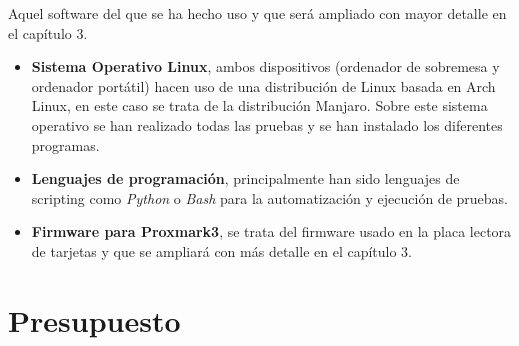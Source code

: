 Aquel software del que se ha hecho uso y que será ampliado con mayor detalle en el capítulo 3.

\begin{itemize}
  \item \textbf{Sistema Operativo Linux}, ambos dispositivos (ordenador de sobremesa y ordenador portátil) hacen uso de
    una distribución de Linux basada en Arch Linux, en este caso se trata de la distribución Manjaro. Sobre este
    sistema operativo se han realizado todas las pruebas y se han instalado los diferentes programas.
  \item \textbf{Lenguajes de programación}, principalmente han sido lenguajes de scripting como \textit{Python} o
    \textit{Bash} para la automatización y ejecución de pruebas.
  \item \textbf{Firmware para Proxmark3}, se trata del firmware usado en la placa lectora de tarjetas y que se ampliará
    con más detalle en el capítulo 3.
\end{itemize}

\section{Presupuesto}
